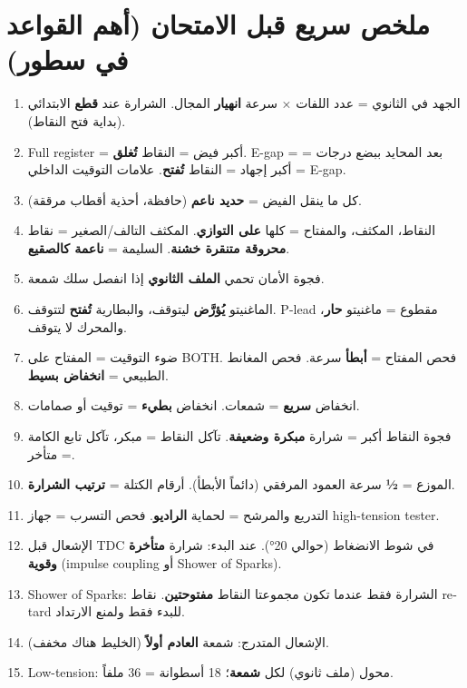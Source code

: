 \documentclass[11pt,a4paper]{article}
\newcommand{\en}[1]{\textenglish{#1}}
\begin{document}
\section{ملخص سريع قبل الامتحان (أهم القواعد في سطور)}
\begin{enumerate}[label=\arabic*.]
  \item الجهد في الثانوي = عدد اللفات × سرعة \textbf{انهيار} المجال. الشرارة عند \textbf{قطع} الابتدائي (بداية فتح النقاط).
  \item \en{Full register} = أكبر فيض = النقاط \textbf{تُغلق}. \en{E-gap} = بعد المحايد ببضع درجات = أكبر إجهاد = النقاط \textbf{تُفتح}. علامات التوقيت الداخلي = \en{E-gap}.
  \item كل ما ينقل الفيض = \textbf{حديد ناعم} (حافظة، أحذية أقطاب مرققة).
  \item النقاط، المكثف، والمفتاح = كلها \textbf{على التوازي}. المكثف التالف/الصغير = نقاط \textbf{محروقة متنقرة خشنة}. السليمة = \textbf{ناعمة كالصقيع}.
  \item فجوة الأمان تحمي \textbf{الملف الثانوي} إذا انفصل سلك شمعة.
  \item الماغنيتو \textbf{يُؤرَّض} ليتوقف، والبطارية \textbf{تُفتح} لتتوقف. \en{P-lead} مقطوع = ماغنيتو \textbf{حار}، والمحرك لا يتوقف.
  \item ضوء التوقيت = المفتاح على \en{BOTH}. فحص المفتاح = \textbf{أبطأ} سرعة. فحص المغانط الطبيعي = \textbf{انخفاض بسيط}.
  \item انخفاض \textbf{سريع} = شمعات. انخفاض \textbf{بطيء} = توقيت أو صمامات.
  \item فجوة النقاط أكبر = شرارة \textbf{مبكرة وضعيفة}. تآكل النقاط = مبكر، تآكل تابع الكامة = متأخر.
  \item الموزع = \textbf{½} سرعة العمود المرفقي (دائماً الأبطأ). أرقام الكتلة = \textbf{ترتيب الشرارة}.
  \item التدريع والمرشح = لحماية \textbf{الراديو}. فحص التسرب = جهاز \en{high-tension tester}.
  \item الإشعال قبل \en{TDC} في شوط الانضغاط (حوالي 20°). عند البدء: شرارة \textbf{متأخرة وقوية} (\en{impulse coupling} أو \en{Shower of Sparks}).
  \item \en{Shower of Sparks}: الشرارة فقط عندما تكون مجموعتا النقاط \textbf{مفتوحتين}. نقاط \en{retard} للبدء فقط ولمنع الارتداد.
  \item الإشعال المتدرج: شمعة \textbf{العادم أولاً} (الخليط هناك مخفف).
  \item \en{Low-tension}: محول (ملف ثانوي) لكل \textbf{شمعة}؛ 18 أسطوانة = 36 ملفاً.

\end{enumerate}
\end{document}
